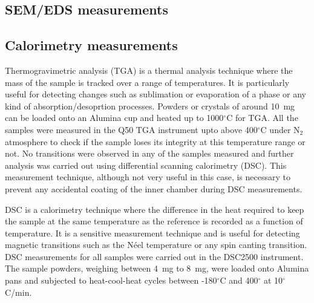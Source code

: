 \documentclass[10pt,doublespacing,edeposit]{uiucthesis2020}
\begin{document}
\begin{mainmatter}

\subsection{SEM/EDS measurements}


\subsection{Calorimetry measurements}


Thermogravimetric analysis (TGA) is a thermal analysis technique where the mass of the sample is tracked over a range of temperatures. It is particularly useful for detecting changes such as sublimation or evaporation of a phase or any kind of absorption/desoprtion processes. Powders or crystals of around 10~mg can be loaded onto an Alumina cup and heated up to 1000$^\circ$C for TGA. All the samples were measured in the Q50 TGA instrument upto above 400$^\circ$C under N$_2$ atmosphere to check if the sample loses its integrity at this temperature range or not. No transitions were observed in any of the samples measured and further analysis was carried out using differential scanning calorimetry (DSC). This measurement technique, although not very useful in this case, is necessary to prevent any accidental coating of the inner chamber during DSC measurements.

DSC is a calorimetry technique where the difference in the heat required to keep the sample at the same temperature as the reference is recorded as a function of temperature. It is a sensitive measurement technique and is useful for detecting magnetic transitions such as the N\'eel temperature or any spin canting transition. DSC measurements for all samples were carried out in the DSC2500 instrument. The sample powders, weighing between 4~mg to 8~mg, were loaded onto Alumina pans and subjected to heat-cool-heat cycles between -180$^\circ$C and 400$^\circ$ at 10$^\circ$C/min.


\end{mainmatter}
\end{document}
